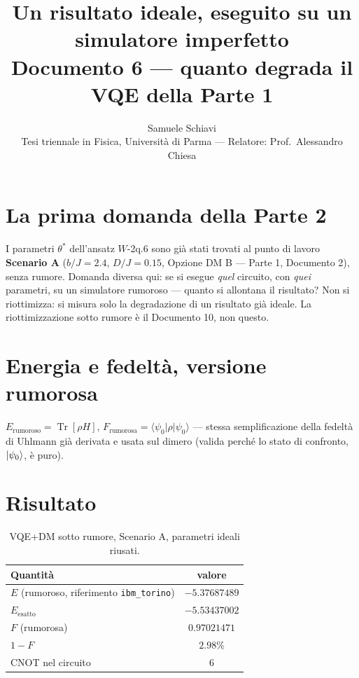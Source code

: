 \documentclass[11pt,a4paper]{article}
\title{\bfseries Un risultato ideale, eseguito su un simulatore imperfetto\\[2pt]
\large Documento 6 --- quanto degrada il VQE della Parte 1}
\author{Samuele Schiavi \\ \small Tesi triennale in Fisica, Università di Parma
--- Relatore: Prof.\ Alessandro Chiesa}
\date{}
\providecommand{\Tr}{\operatorname{Tr}}
\begin{document}
\maketitle
\thispagestyle{fancy}

\section{La prima domanda della Parte 2}

I parametri $\theta^*$ dell'ansatz $W$-2q.6 sono già stati trovati al punto
di lavoro \textbf{Scenario A} ($b/J=2.4$, $D/J=0.15$, Opzione DM B --- Parte
1, Documento 2), senza rumore. Domanda diversa qui: se si esegue
\emph{quel} circuito, con \emph{quei} parametri, su un simulatore rumoroso
--- quanto si allontana il risultato? Non si riottimizza: si misura
solo la degradazione di un risultato già ideale. La riottimizzazione sotto
rumore è il Documento 10, non questo.

\section{Energia e fedeltà, versione rumorosa}

$E_\text{rumoroso}=\Tr[\rho H]$, $F_\text{rumorosa}=\langle\psi_0|\rho|
\psi_0\rangle$ --- stessa semplificazione della fedeltà di Uhlmann già
derivata e usata sul dimero (valida perché lo stato di confronto,
$\lvert \psi_0\rangle$, è puro).

\section{Risultato}

\begin{table}[htbp]
\centering
\small
\renewcommand{\arraystretch}{1.3}
\begin{tabular}{@{}lc@{}}
\toprule
\rowcolor{grigetto}
\textbf{Quantità} & \textbf{valore} \\
\midrule
$E$ (rumoroso, riferimento \texttt{ibm\_torino}) & $-5.37687489$ \\
$E_\text{esatto}$ & $-5.53437002$ \\
$F$ (rumorosa) & $0.97021471$ \\
$1-F$ & $2.98\%$ \\
CNOT nel circuito & $6$ \\
\bottomrule
\end{tabular}
\caption{VQE+DM sotto rumore, Scenario A, parametri ideali riusati.}
\end{table}
\FloatBarrier
\end{document}
